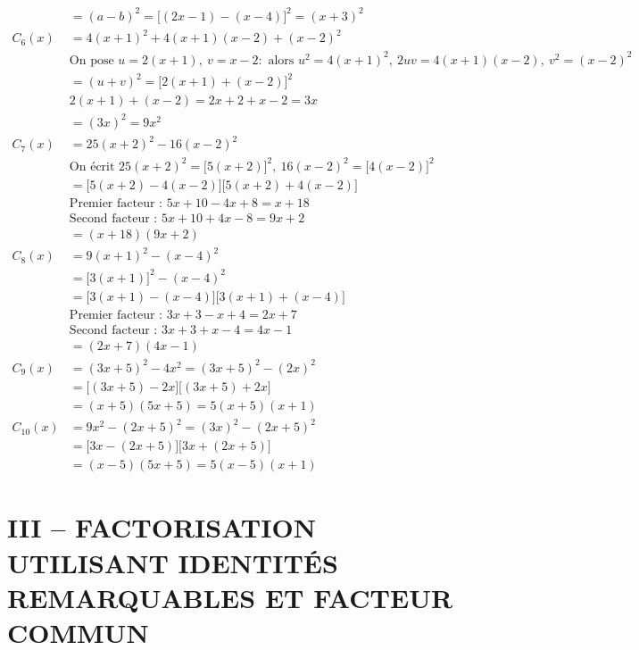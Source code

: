 \documentclass[11pt]{article}
\begin{document}
\[\begin{aligned}
		&= (a-b)^2 = \big[(2x-1)-(x-4)\big]^2 = (x+3)^2\\[6pt]
		C_6(x) &= 4(x+1)^2+4(x+1)(x-2)+(x-2)^2\\
		&\text{On pose } u=2(x+1),\ v=x-2 : \text{ alors } u^2=4(x+1)^2,\ 2uv=4(x+1)(x-2),\ v^2=(x-2)^2\\
		&= (u+v)^2 = \big[2(x+1)+(x-2)\big]^2\\
		&2(x+1)+(x-2) = 2x+2+x-2 = 3x\\
		&= (3x)^2 = 9x^2\\[6pt]
		C_7(x) &= 25(x+2)^2-16(x-2)^2\\
		&\text{On écrit } 25(x+2)^2=\big[5(x+2)\big]^2,\ 16(x-2)^2=\big[4(x-2)\big]^2\\
		&= \big[5(x+2)-4(x-2)\big]\big[5(x+2)+4(x-2)\big]\\
		&\text{Premier facteur : } 5x+10-4x+8 = x+18\\
		&\text{Second facteur : } 5x+10+4x-8 = 9x+2\\
		&= (x+18)(9x+2)\\[6pt]
		C_8(x) &= 9(x+1)^2-(x-4)^2\\
		&= \big[3(x+1)\big]^2-(x-4)^2\\
		&= \big[3(x+1)-(x-4)\big]\big[3(x+1)+(x-4)\big]\\
		&\text{Premier facteur : } 3x+3-x+4 = 2x+7\\
		&\text{Second facteur : } 3x+3+x-4 = 4x-1\\
		&= (2x+7)(4x-1)\\[6pt]
		C_9(x) &= (3x+5)^2-4x^2 = (3x+5)^2-(2x)^2\\
		&= \big[(3x+5)-2x\big]\big[(3x+5)+2x\big]\\
		&= (x+5)(5x+5) = 5(x+5)(x+1)\\[6pt]
		C_{10}(x) &= 9x^2-(2x+5)^2 = (3x)^2-(2x+5)^2\\
		&= \big[3x-(2x+5)\big]\big[3x+(2x+5)\big]\\
		&= (x-5)(5x+5) = 5(x-5)(x+1)
	\end{aligned}
	\]
	
	\section*{III -- FACTORISATION UTILISANT IDENTITÉS REMARQUABLES ET FACTEUR COMMUN}
	
\end{document}

